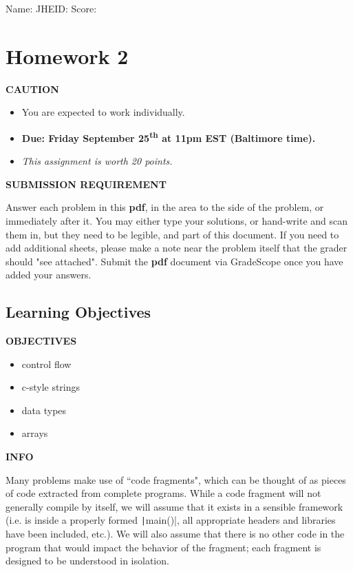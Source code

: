 \documentclass[12pt]{article}
\def \HWNumber {2}
\newenvironment{caution}{\par\begin{mdframed}[linewidth=1pt,linecolor=YellowOrange]%
		\begin{list}{}{\leftmargin=0cm}\item[\Large\bcdanger]}
		{\end{list}\end{mdframed}\par}
\newenvironment{danger}{\par\begin{mdframed}[linewidth=1pt,linecolor=Red]%
		\begin{list}{}{\leftmargin=0cm}\item[\Large\bcbombe]}
		{\end{list}\end{mdframed}\par}
\newenvironment{tip}{\par\begin{mdframed}[linewidth=1pt,linecolor=ForestGreen]%
		\begin{list}{}{\leftmargin=0cm}\item[\Large\bclampe]}
		{\end{list}\end{mdframed}\par}
\newenvironment{info}{\par\begin{mdframed}[linewidth=1pt,linecolor=Cerulean]%
		\begin{list}{}{\leftmargin=0cm}\item[\Large\bcinfo]}
		{\end{list}\end{mdframed}\par}
\def \SName {}
\def \JHEID {}
\begin{document}
\noindent Name: \framebox[5.5cm]{\SName\rule{0pt}{12pt}} \hfill
JHEID: \framebox[3cm]{\JHEID\rule{0pt}{12pt}}\hfill
Score: \framebox[2cm]{\rule{0pt}{12pt}}

\section*{Homework \HWNumber}

\begin{caution}
	\textbf{CAUTION}
	
	\begin{itemize}
		\item You are expected to work individually.
		\item \textbf{Due: Friday September 25\textsuperscript{th} at 11pm EST (Baltimore time).}
		\item \textit{This assignment is worth 20 points. }
	\end{itemize}
\end{caution}

\begin{danger}
	\textbf{SUBMISSION REQUIREMENT}
	
	Answer each problem in this \textbf{pdf}, in the area to the side of the problem, or immediately after it.  You may either type your solutions, or hand-write and scan them in, but they need to be legible, and part of this document. If you need to add additional sheets, please make a note near the problem itself that the grader should "see attached". Submit the \textbf{pdf} document via GradeScope once you have added your answers.
\end{danger}

\subsection*{Learning Objectives}
\begin{tip}
	\textbf{OBJECTIVES}
	
	\begin{itemize}
		\item control flow
		\item c-style strings
		\item data types
		\item arrays
	\end{itemize}
\end{tip}

\begin{info}
	\textbf{INFO}
	
	Many problems make use of “code fragments", which can be thought of as pieces of code extracted from complete programs. While a code fragment will not generally compile by itself, we will assume that it exists in a sensible framework (i.e. is inside a properly formed \texttt|main()|, all appropriate headers and libraries have been included, etc.). We will also assume that there is no other code in the program that would impact the behavior of the fragment; each fragment is designed to be understood in isolation.
\end{info}
\end{document}
